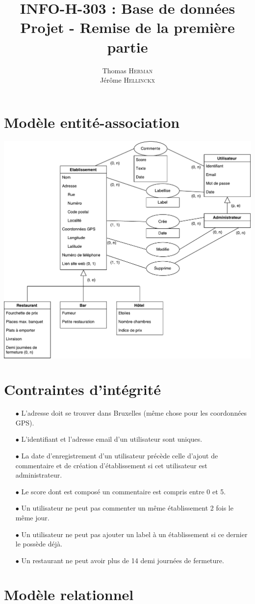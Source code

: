 \documentclass[a4paper, 11pt]{article}
\title{{INFO-H-303 : Base de données} \\ Projet - Remise de la première partie}
\author{Thomas \textsc{Herman} \\ Jérôme \textsc{Hellinckx}}
\begin{document}
\maketitle

\section{Modèle entité-association}
\begin{center}
	\includegraphics[scale=0.6]{horecaEAModel}
\end{center}

\section{Contraintes d'intégrité}

\begin{itemize}
	\item[$\bullet$] L'adresse doit se trouver dans Bruxelles (même chose pour les coordonnées GPS).
	\item[$\bullet$] L'identifiant et l'adresse email d'un utilisateur sont uniques.
	\item[$\bullet$] La date d'enregistrement d'un utilisateur précède celle d'ajout de commentaire et de création d'établissement si cet utilisateur est administrateur.
	\item[$\bullet$] Le score dont est composé un commentaire est compris entre 0 et 5.
	\item[$\bullet$] Un utilisateur ne peut pas commenter un même établissement 2 fois le même jour.
	\item[$\bullet$] Un utilisateur ne peut pas ajouter un label à un établissement si ce dernier le possède déjà.
	\item[$\bullet$] Un restaurant ne peut avoir plus de 14 demi journées de fermeture.
\end{itemize}

\section{Modèle relationnel}
\end{document}
